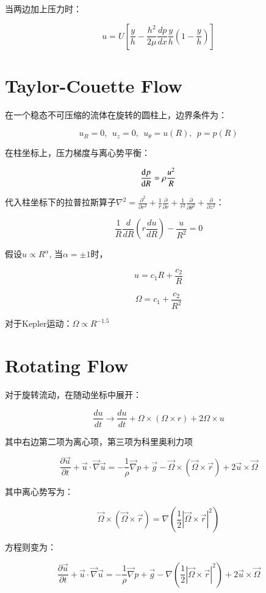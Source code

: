 \documentclass[fontset=windows]{report}
\begin{document}
当两边加上压力时：

\[u=U\left[\frac{y}{h}-\frac{h^2}{2\mu}\frac{dp}{dx}\frac{y}{h}(1-\frac{y}{h})\right]\]


\section{Taylor-Couette Flow}

在一个稳态不可压缩的流体在旋转的圆柱上，边界条件为：

\[u_R=0,\ \ u_z=0,\ \ u_{\theta}=u(R),\ \ p=p(R)\]

在柱坐标上，压力梯度与离心势平衡：

\[\frac{{\rm d} p}{{\rm d}R}=\rho\frac{u^2}{R}\]

代入柱坐标下的拉普拉斯算子\(\nabla ^2=\frac{\partial^2}{\partial r^2}+\frac 1 r\frac \partial {\partial r}+\frac 1 {r^2}\frac \partial {\partial \theta ^2}+\frac \partial {\partial z ^2}\)：

\[\frac{1}{R}\frac{d}{dR}(r\frac{du}{dR})-\frac{u}{R^2}=0\]

假设\(u\propto R^{\alpha}\), 当\(\alpha=\pm 1\)时，

\[u=c_1R+\frac{c_2}{R}\]

\[\Omega=c_1+\frac{c_2}{R^2}\]

对于Kepler运动：\(\Omega\propto R^{-1.5}\)


\section{Rotating Flow}

对于旋转流动，在随动坐标中展开：

\[\frac{du}{dt}\longrightarrow \frac{d u}{d t}+\Omega\times(\Omega\times r)+2\Omega\times u\]

其中右边第二项为离心项，第三项为科里奥利力项

\[\frac{\partial \vec{u}}{\partial t}+\vec{u} \cdot \vec{\nabla} \vec{u}=-\frac{1}{\rho} \vec{\nabla} p+\vec{g}-\vec{\Omega} \times(\vec{\Omega} \times \vec{r})+{2 \vec{u} \times \vec{\Omega}}\]

其中离心势写为：

\[\vec{\Omega} \times(\vec{\Omega} \times \vec{r})=\nabla(\frac{1}{2}|\vec\Omega\times \vec r|^2)\]

方程则变为：

\[\frac{\partial \vec{u}}{\partial t}+\vec{u} \cdot \vec{\nabla} \vec{u}=-\frac{1}{\rho} \vec{\nabla} p+\vec{g}-\nabla(\frac{1}{2}|\vec\Omega\times \vec r|^2)
+{2 \vec{u} \times \vec{\Omega}}\]
\end{document}
